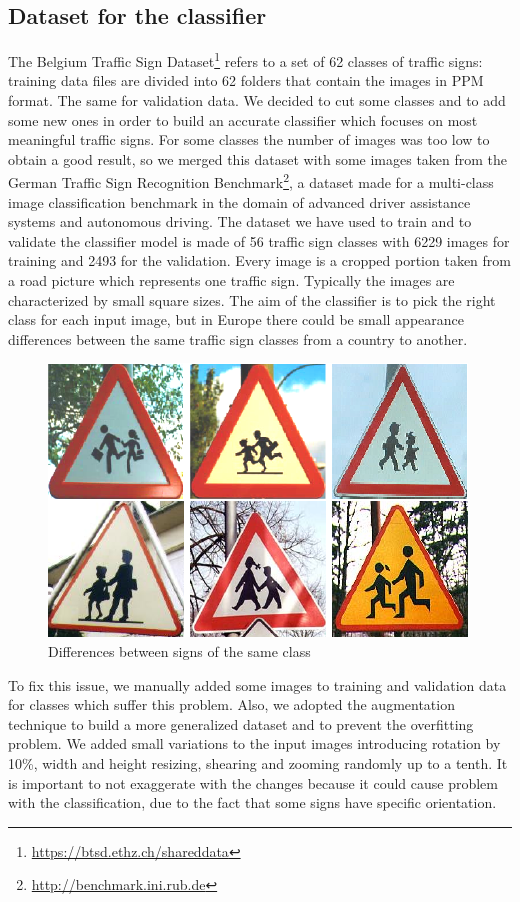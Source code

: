 \documentclass[10pt,twocolumn,letterpaper]{article}
\begin{document}
\subsection{Dataset for the classifier}
The Belgium Traffic Sign Dataset\footnote{\url{https://btsd.ethz.ch/shareddata}} refers to a set of 62 classes of traffic signs: training data files are divided into 62 folders that contain the images in PPM format. The same for validation data. We decided to cut some classes and to add some new ones in order to build an accurate classifier which focuses on most meaningful traffic signs. For some classes the number of images was too low to obtain a good result, so we merged this dataset with some images taken from the German Traffic Sign Recognition Benchmark\footnote{\url{http://benchmark.ini.rub.de}}, a dataset made for a multi-class image classification benchmark in the domain of advanced driver assistance systems and autonomous driving. The dataset we have used to train and to validate the classifier model is made of 56 traffic sign classes with 6229 images for training and 2493 for the validation. Every image is a cropped portion taken from a road picture which represents one traffic sign. Typically the images are characterized by small square sizes. The aim of the classifier is to pick the right class for each input image, but in Europe there could be small appearance differences between the same traffic sign classes from a country to another. 
\begin{figure}{}
	\centering
	\includegraphics[width=0.6\linewidth]{Res/Immagini/differences.png}
	\caption{Differences between signs of the same class}\label{}
\end{figure}
To fix this issue, we manually added some images to training and validation data for classes which suffer this problem. Also, we adopted the augmentation technique to build a more generalized dataset and to prevent the overfitting problem. We added small variations to the input images introducing rotation by 10\%, width and height resizing, shearing and zooming randomly up to a tenth. It is important to not exaggerate with the changes because it could cause problem with the classification, due to the fact that some signs have specific orientation.
\end{document}
